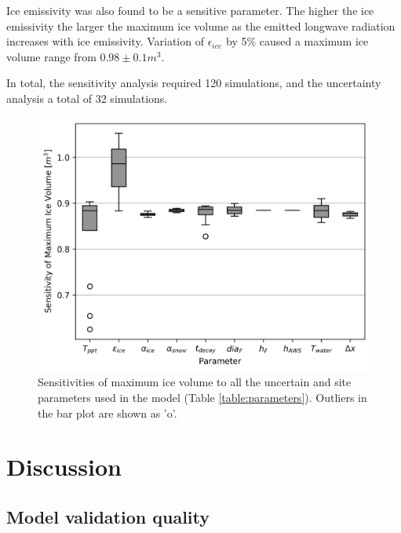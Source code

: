 \documentclass[utf8]{frontiersSCNS} %
\begin{document}
Ice emissivity was also found to be a sensitive parameter. The higher the ice emissivity the larger the maximum ice
volume as the emitted longwave radiation increases with ice emissivity. Variation of $\epsilon_{ice}$ by 5\% caused a
maximum ice volume range from $0.98 \pm 0.1 m^3$. 

In total, the sensitivity analysis required 120 simulations, and the uncertainty analysis a total of 32 simulations.

\begin{figure} \begin{center} \includegraphics[width=10 cm]{Figures/Figure_9.jpg} \end{center}
\caption{Sensitivities of maximum ice volume to all the uncertain and site parameters used in the model (Table
\ref{table:parameters}).  Outliers in the bar plot are shown as 'o'.} \label{fig:sensitivity} \end{figure}

\section{Discussion}

\subsection{Model validation quality}
\end{document}
